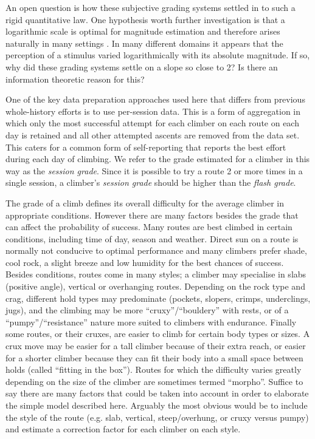 \documentclass{article}
\begin{document}
An open question is how these subjective grading systems settled in to such a rigid quantitative law. One hypothesis worth further investigation is that a logarithmic scale is optimal for magnitude estimation and therefore arises naturally in many settings \cite{portugal2011weber}. In many different domains it appears that the perception of a stimulus varied logarithmically with its absolute magnitude. If so, why did these grading systems settle on a slope so close to 2? Is there an information theoretic reason for this?

One of the key data preparation approaches used here that differs from previous whole-history efforts is to use per-session data. This is a form of aggregation in which only the most successful attempt for each climber on each route on each day is retained and all other attempted ascents are removed from the data set. This caters for a common form of self-reporting that reports the best effort during each day of climbing. We refer to the grade estimated for a climber in this way as the {\it session grade}. Since it is possible to try a route 2 or more times in a single session, a climber's {\it session grade} should be higher than the {\it flash grade}. 

The grade of a climb defines its overall difficulty for the average climber in appropriate conditions. However there are many factors besides the grade that can affect the probability of success. Many routes are best climbed in certain conditions, including time of day, season and weather. Direct sun on a route is normally not conducive to optimal performance and many climbers prefer shade, cool rock, a slight breeze and low humidity for the best chances of success. Besides conditions, routes come in many styles; a climber may specialise in slabs (positive angle), vertical or overhanging routes. Depending on the rock type and crag, different hold types may predominate (pockets, slopers, crimps, underclings, jugs), and the climbing may be more ``cruxy''/``bouldery'' with rests, or of a ``pumpy''/``resistance'' nature more suited to climbers with endurance. Finally some routes, or their cruxes, are easier to climb for certain body types or sizes. A crux move may be easier for a tall climber because of their extra reach, or easier for a shorter climber because they can fit their body into a small space between holds (called ``fitting in the box''). Routes for which the difficulty varies greatly depending on the size of the climber are sometimes termed ``morpho''. Suffice to say there are many factors that could be taken into account in order to elaborate the simple model described here. Arguably the most obvious would be to include the style of the route (e.g. slab, vertical, steep/overhung, or cruxy versus pumpy) and estimate a correction factor for each climber on each style. 
\end{document}
